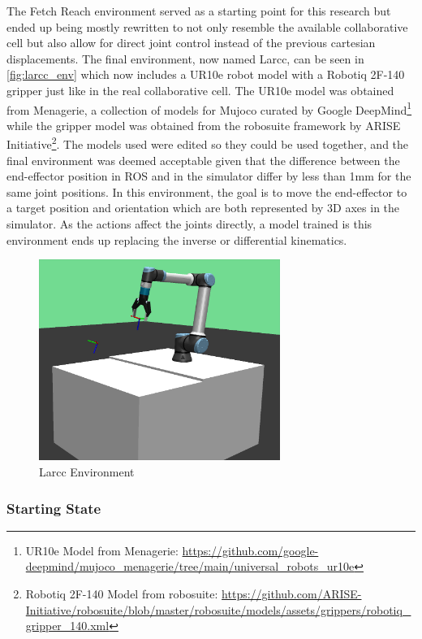 The Fetch Reach environment served as a starting point for this research but ended up being mostly rewritten to not only resemble the available collaborative cell but also allow for direct joint control instead of the previous cartesian displacements. The final environment, now named Larcc, can be seen in \autoref{fig:larcc_env} which now includes a UR10e robot model with a Robotiq 2F-140 gripper just like in the real collaborative cell. The UR10e model was obtained from Menagerie, a collection of models for Mujoco curated by Google DeepMind\footnote{UR10e Model from Menagerie: \url{https://github.com/google-deepmind/mujoco_menagerie/tree/main/universal_robots_ur10e}} while the gripper model was obtained from the robosuite framework by
ARISE Initiative\footnote{Robotiq 2F-140 Model from robosuite: \url{https://github.com/ARISE-Initiative/robosuite/blob/master/robosuite/models/assets/grippers/robotiq_gripper_140.xml}}. The models used were edited so they could be used together, and the final environment was deemed acceptable given that the difference between the end-effector position in ROS and in the simulator differ by less than 1mm for the same joint positions. In this environment, the goal is to move the end-effector to a target position and orientation which are both represented by 3D axes in the simulator. As the actions affect the joints directly, a model trained is this environment ends up replacing the inverse or differential kinematics.

\begin{figure}[H]%
    \centerline{\includegraphics[width=0.7\textwidth]{figs/larcc_env.png}}
    \caption[Larcc Environment]{Larcc Environment}
    \label{fig:larcc_env}
\end{figure}

\subsubsection{Starting State}


